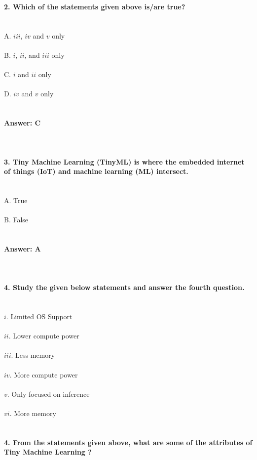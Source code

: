\documentclass[prl,twocolumn,showpacs,preprintnumbers,superscriptaddress]{revtex4}
\theoremstyle{plain}
\theoremstyle{definition}
\begin{document}
\begin{widetext}
\textbf{2. Which of the statements given above is/are true?}
\\
\\
\\
A. $iii$, $iv$ and $v$ only
\\
\\
B. $i$, $ii$, and $iii$ only
\\
\\
C. $i$ and $ii$ only
\\
\\
D. $iv$ and $v$ only
\\
\\
\\
\textbf{Answer: C}
\\
\\
\\
\\
\textbf{3. Tiny Machine Learning (TinyML) is where the embedded internet of things (IoT) and machine learning (ML) intersect.}
\\
\\
\\
A. True
\\
\\
B. False
\\
\\
\\
\textbf{Answer: A}
\\
\\
\\
\\
\textbf{4. Study the given below statements and answer the fourth question.}
\\
\\
\\
$i$. Limited OS Support
\\
\\
$ii$. Lower compute power
\\
\\
$iii$. Less memory
\\
\\
$iv$. More compute power
\\
\\
$v$. Only focused on inference
\\
\\
$vi$. More memory
\\
\\
\\
\textbf{4. From the statements given above, what are some of the attributes of Tiny Machine Learning ?}

\end{widetext}
\end{document}
